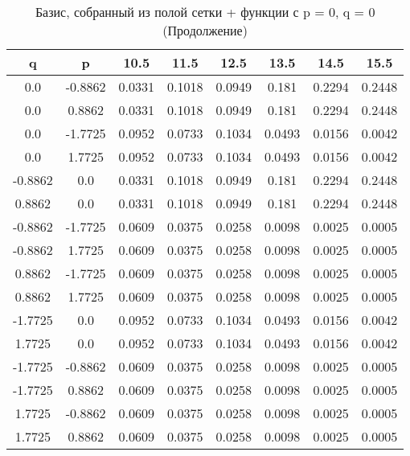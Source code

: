 \documentclass[a4paper,14pt]{extarticle}
\begin{document}
\begin{landscape}
\begin{table}[H]
\centering
\caption{Базис, собранный из полой сетки + функции с p = 0, q = 0 (Продолжение)}
\begin{tabular}{|c|c|*{6}{c}|}
\hline
q       & p       & 10.5   & 11.5   & 12.5   & 13.5   & 14.5   & 15.5   \\ 
\hline                                                         
0.0     & -0.8862 & 0.0331 & 0.1018 & 0.0949 & 0.181  & 0.2294 & 0.2448 \\ 
0.0     & 0.8862  & 0.0331 & 0.1018 & 0.0949 & 0.181  & 0.2294 & 0.2448 \\ 
0.0     & -1.7725 & 0.0952 & 0.0733 & 0.1034 & 0.0493 & 0.0156 & 0.0042 \\ 
0.0     & 1.7725  & 0.0952 & 0.0733 & 0.1034 & 0.0493 & 0.0156 & 0.0042 \\ 
-0.8862 & 0.0     & 0.0331 & 0.1018 & 0.0949 & 0.181  & 0.2294 & 0.2448 \\ 
0.8862  & 0.0     & 0.0331 & 0.1018 & 0.0949 & 0.181  & 0.2294 & 0.2448 \\ 
-0.8862 & -1.7725 & 0.0609 & 0.0375 & 0.0258 & 0.0098 & 0.0025 & 0.0005 \\ 
-0.8862 & 1.7725  & 0.0609 & 0.0375 & 0.0258 & 0.0098 & 0.0025 & 0.0005 \\ 
0.8862  & -1.7725 & 0.0609 & 0.0375 & 0.0258 & 0.0098 & 0.0025 & 0.0005 \\ 
0.8862  & 1.7725  & 0.0609 & 0.0375 & 0.0258 & 0.0098 & 0.0025 & 0.0005 \\ 
-1.7725 & 0.0     & 0.0952 & 0.0733 & 0.1034 & 0.0493 & 0.0156 & 0.0042 \\ 
1.7725  & 0.0     & 0.0952 & 0.0733 & 0.1034 & 0.0493 & 0.0156 & 0.0042 \\ 
-1.7725 & -0.8862 & 0.0609 & 0.0375 & 0.0258 & 0.0098 & 0.0025 & 0.0005 \\ 
-1.7725 & 0.8862  & 0.0609 & 0.0375 & 0.0258 & 0.0098 & 0.0025 & 0.0005 \\ 
1.7725  & -0.8862 & 0.0609 & 0.0375 & 0.0258 & 0.0098 & 0.0025 & 0.0005 \\ 
1.7725  & 0.8862  & 0.0609 & 0.0375 & 0.0258 & 0.0098 & 0.0025 & 0.0005 \\ 
\hline
\end{tabular}
\end{table} 


\end{landscape}
\end{document}
